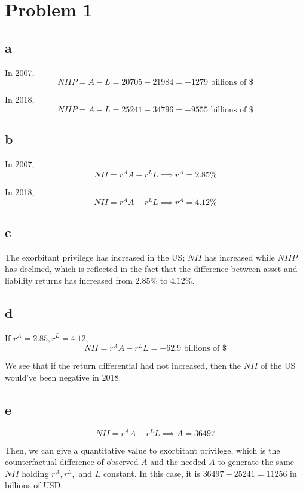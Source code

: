 \documentclass[12pt,letterpaper]{article}
\theoremstyle{definition}
\begin{document}
\section*{Problem 1}

\subsection*{a}

In 2007,
\[
  NIIP = A - L = 20705 - 21984 = -1279 \text{ billions of \$}
\]

In 2018,
\[
  NIIP = A - L = 25241 - 34796 = -9555 \text{ billions of \$}
\]

\subsection*{b}

In 2007,
\[
  NII = r^AA - r^LL \implies r^A = 2.85 \%
\]

In 2018,
\[
  NII = r^AA - r^LL \implies r^A = 4.12 \%
\]

\subsection*{c}

The exorbitant privilege has increased in the US; $NII$ has increased while
$NIIP$ has declined, which is reflected in the fact that the difference between
asset and liability returns has increased from $2.85\%$ to $4.12\%$.

\subsection*{d}

If $r^A = 2.85, r^L = 4.12$,
\[
  NII = r^AA - r^LL = -62.9 \text{ billions of \$}
\]

We see that if the return differential had not increased, then the $NII$ of the
US would've been negative in 2018.

\subsection*{e}

\[
  NII = r^AA - r^LL \implies A = 36497
\]

Then, we can give a quantitative value to exorbitant privilege, which is the
counterfactual difference of observed $A$ and the needed $A$ to generate the
same $NII$ holding $r^A, r^L,$ and $L$ constant. In this case, it is $36497 -
25241 = 11256$ in billions of USD.
\end{document}
